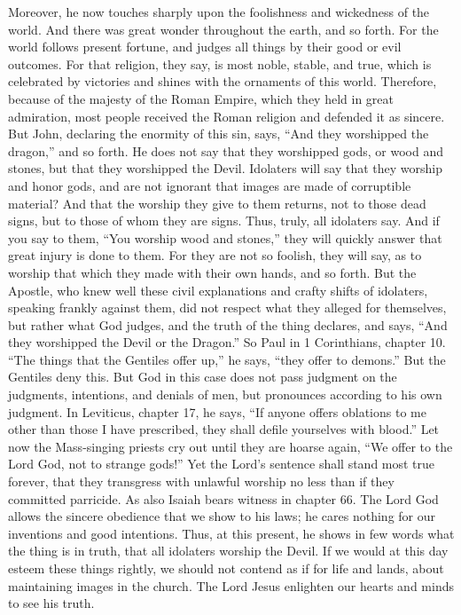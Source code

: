 Moreover, he now touches sharply upon the foolishness and wickedness of the world. And there was great wonder throughout the earth, and so forth. For the world follows present fortune, and judges all things by their good or evil outcomes. For that religion, they say, is most noble, stable, and true, which is celebrated by victories and shines with the ornaments of this world. Therefore, because of the majesty of the Roman Empire, which they held in great admiration, most people received the Roman religion and defended it as sincere. But John, declaring the enormity of this sin, says, “And they worshipped the dragon,” and so forth. He does not say that they worshipped gods, or wood and stones, but that they worshipped the Devil. Idolaters will say that they worship and honor gods, and are not ignorant that images are made of corruptible material? And that the worship they give to them returns, not to those dead signs, but to those of whom they are signs. Thus, truly, all idolaters say. And if you say to them, “You worship wood and stones,” they will quickly answer that great injury is done to them. For they are not so foolish, they will say, as to worship that which they made with their own hands, and so forth. But the Apostle, who knew well these civil explanations and crafty shifts of idolaters, speaking frankly against them, did not respect what they alleged for themselves, but rather what God judges, and the truth of the thing declares, and says, “And they worshipped the Devil or the Dragon.” So Paul in 1 Corinthians, chapter 10. “The things that the Gentiles offer up,” he says, “they offer to demons.” But the Gentiles deny this. But God in this case does not pass judgment on the judgments, intentions, and denials of men, but pronounces according to his own judgment. In Leviticus, chapter 17, he says, “If anyone offers oblations to me other than those I have prescribed, they shall defile yourselves with blood.” Let now the Mass-singing priests cry out until they are hoarse again, “We offer to the Lord God, not to strange gods!” Yet the Lord’s sentence shall stand most true forever, that they transgress with unlawful worship no less than if they committed parricide. As also Isaiah bears witness in chapter 66. The Lord God allows the sincere obedience that we show to his laws; he cares nothing for our inventions and good intentions. Thus, at this present, he shows in few words what the thing is in truth, that all idolaters worship the Devil. If we would at this day esteem these things rightly, we should not contend as if for life and lands, about maintaining images in the church. The Lord Jesus enlighten our hearts and minds to see his truth.
